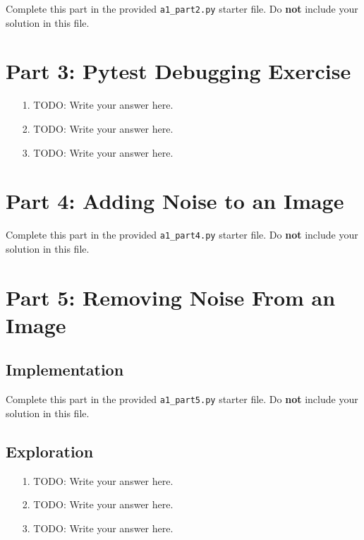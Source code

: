 \documentclass[fontsize=11pt]{article}
\begin{document}
Complete this part in the provided \texttt{a1\_part2.py} starter file.
Do \textbf{not} include your solution in this file.

\section*{Part 3: Pytest Debugging Exercise}


\begin{enumerate}
\item[1.]
TODO: Write your answer here.

\item[2.]
TODO: Write your answer here.

\item[3.]
TODO: Write your answer here.
\end{enumerate}

\section*{Part 4: Adding Noise to an Image}

Complete this part in the provided \texttt{a1\_part4.py} starter file.
Do \textbf{not} include your solution in this file.

\newpage

\section*{Part 5: Removing Noise From an Image}

\subsection*{Implementation}

Complete this part in the provided \texttt{a1\_part5.py} starter file.
Do \textbf{not} include your solution in this file.

\subsection*{Exploration}

\begin{enumerate}
\item[1.] TODO: Write your answer here.
\item[2.] TODO: Write your answer here.
\item[3.] TODO: Write your answer here.
\end{enumerate}
\end{document}
